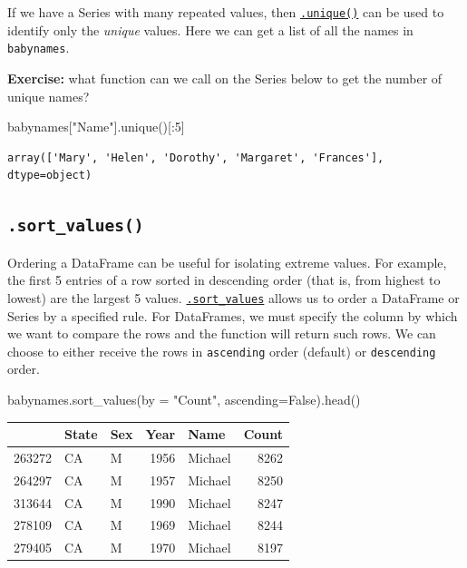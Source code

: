 \documentclass[
  letterpaper,
  DIV=11,
  numbers=noendperiod]{scrreprt}
\newenvironment{Shaded}{\begin{snugshade}}{\end{snugshade}}
\newcommand{\DecValTok}[1]{\textcolor[rgb]{0.68,0.00,0.00}{#1}}
\newcommand{\NormalTok}[1]{\textcolor[rgb]{0.00,0.23,0.31}{#1}}
\newcommand{\OperatorTok}[1]{\textcolor[rgb]{0.37,0.37,0.37}{#1}}
\newcommand{\StringTok}[1]{\textcolor[rgb]{0.13,0.47,0.30}{#1}}
\newcommand{\VariableTok}[1]{\textcolor[rgb]{0.07,0.07,0.07}{#1}}
\begin{document}
If we have a Series with many repeated values, then
\href{https://pandas.pydata.org/docs/reference/api/pandas.unique.html}{\texttt{.unique()}}
can be used to identify only the \emph{unique} values. Here we can get a
list of all the names in \texttt{babynames}.

\textbf{Exercise:} what function can we call on the Series below to get
the number of unique names?

\begin{Shaded}
\begin{Highlighting}[]
\NormalTok{babynames[}\StringTok{"Name"}\NormalTok{].unique()[:}\DecValTok{5}\NormalTok{]}
\end{Highlighting}
\end{Shaded}

\begin{verbatim}
array(['Mary', 'Helen', 'Dorothy', 'Margaret', 'Frances'], dtype=object)
\end{verbatim}

\hypertarget{sort_values}{%
\subsection{\texorpdfstring{\texttt{.sort\_values()}}{.sort\_values()}}\label{sort_values}}

Ordering a DataFrame can be useful for isolating extreme values. For
example, the first 5 entries of a row sorted in descending order (that
is, from highest to lowest) are the largest 5 values.
\href{https://pandas.pydata.org/docs/reference/api/pandas.DataFrame.sort_values.html}{\texttt{.sort\_values}}
allows us to order a DataFrame or Series by a specified rule. For
DataFrames, we must specify the column by which we want to compare the
rows and the function will return such rows. We can choose to either
receive the rows in \texttt{ascending} order (default) or
\texttt{descending} order.

\begin{Shaded}
\begin{Highlighting}[]
\NormalTok{babynames.sort\_values(by }\OperatorTok{=} \StringTok{"Count"}\NormalTok{, ascending}\OperatorTok{=}\VariableTok{False}\NormalTok{).head()}
\end{Highlighting}
\end{Shaded}

\begin{tabular}{lllrlr}
\toprule
{} & State & Sex &  Year &     Name &  Count \\
\midrule
263272 &    CA &   M &  1956 &  Michael &   8262 \\
264297 &    CA &   M &  1957 &  Michael &   8250 \\
313644 &    CA &   M &  1990 &  Michael &   8247 \\
278109 &    CA &   M &  1969 &  Michael &   8244 \\
279405 &    CA &   M &  1970 &  Michael &   8197 \\
\bottomrule
\end{tabular}
\end{document}
